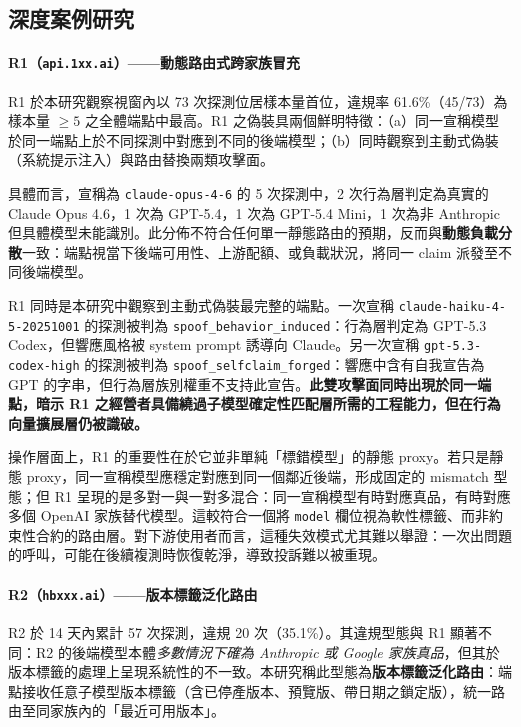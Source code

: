 \documentclass[UTF8,fontset=none,10pt,a4paper,twocolumn]{ctexart}
\begin{document}
\subsection{深度案例研究}\label{sec:cases}

\paragraph{R1（\texttt{api.1xx.ai}）——動態路由式跨家族冒充}
R1 於本研究觀察視窗內以 73 次探測位居樣本量首位，違規率 61.6\%（45/73）為樣本量 ${\geq}5$ 之全體端點中最高。R1 之偽裝具兩個鮮明特徵：（a）同一宣稱模型於同一端點上於不同探測中對應到不同的後端模型；（b）同時觀察到主動式偽裝（系統提示注入）與路由替換兩類攻擊面。

具體而言，宣稱為 \texttt{claude-opus-4-6} 的 5 次探測中，2 次行為層判定為真實的 Claude Opus 4.6，1 次為 GPT-5.4，1 次為 GPT-5.4 Mini，1 次為非 Anthropic 但具體模型未能識別。此分佈不符合任何單一靜態路由的預期，反而與\textbf{動態負載分散}一致：端點視當下後端可用性、上游配額、或負載狀況，將同一 claim 派發至不同後端模型。

R1 同時是本研究中觀察到主動式偽裝最完整的端點。一次宣稱 \texttt{claude-haiku-4-5-20251001} 的探測被判為 \texttt{spoof\_behavior\_induced}：行為層判定為 GPT-5.3 Codex，但響應風格被 system prompt 誘導向 Claude。另一次宣稱 \texttt{gpt-5.3-codex-high} 的探測被判為 \texttt{spoof\_selfclaim\_forged}：響應中含有自我宣告為 GPT 的字串，但行為層族別權重不支持此宣告。\textbf{此雙攻擊面同時出現於同一端點，暗示 R1 之經營者具備繞過子模型確定性匹配層所需的工程能力，但在行為向量擴展層仍被識破。}

操作層面上，R1 的重要性在於它並非單純「標錯模型」的靜態 proxy。若只是靜態 proxy，同一宣稱模型應穩定對應到同一個鄰近後端，形成固定的 mismatch 型態；但 R1 呈現的是多對一與一對多混合：同一宣稱模型有時對應真品，有時對應多個 OpenAI 家族替代模型。這較符合一個將 \texttt{model} 欄位視為軟性標籤、而非約束性合約的路由層。對下游使用者而言，這種失效模式尤其難以舉證：一次出問題的呼叫，可能在後續複測時恢復乾淨，導致投訴難以被重現。

\paragraph{R2（\texttt{hbxxx.ai}）——版本標籤泛化路由}
R2 於 14 天內累計 57 次探測，違規 20 次（35.1\%）。其違規型態與 R1 顯著不同：R2 的後端模型本體\emph{多數情況下確為 Anthropic 或 Google 家族真品}，但其於版本標籤的處理上呈現系統性的不一致。本研究稱此型態為\textbf{版本標籤泛化路由}：端點接收任意子模型版本標籤（含已停產版本、預覽版、帶日期之鎖定版），統一路由至同家族內的「最近可用版本」。
\end{document}
